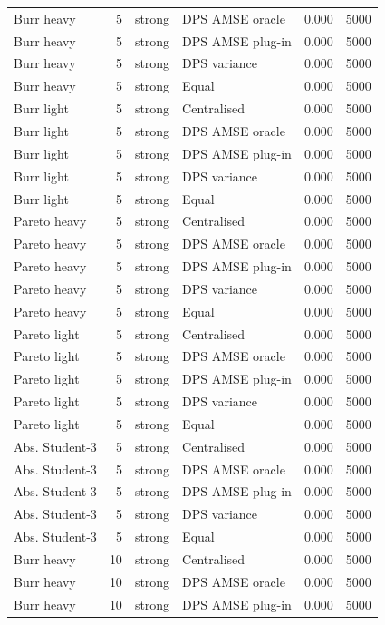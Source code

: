 \begin{tabular}{lrllrr}
Burr heavy & 5 & strong & DPS AMSE oracle & 0.000 & 5000 \\
Burr heavy & 5 & strong & DPS AMSE plug-in & 0.000 & 5000 \\
Burr heavy & 5 & strong & DPS variance & 0.000 & 5000 \\
Burr heavy & 5 & strong & Equal & 0.000 & 5000 \\
Burr light & 5 & strong & Centralised & 0.000 & 5000 \\
Burr light & 5 & strong & DPS AMSE oracle & 0.000 & 5000 \\
Burr light & 5 & strong & DPS AMSE plug-in & 0.000 & 5000 \\
Burr light & 5 & strong & DPS variance & 0.000 & 5000 \\
Burr light & 5 & strong & Equal & 0.000 & 5000 \\
Pareto heavy & 5 & strong & Centralised & 0.000 & 5000 \\
Pareto heavy & 5 & strong & DPS AMSE oracle & 0.000 & 5000 \\
Pareto heavy & 5 & strong & DPS AMSE plug-in & 0.000 & 5000 \\
Pareto heavy & 5 & strong & DPS variance & 0.000 & 5000 \\
Pareto heavy & 5 & strong & Equal & 0.000 & 5000 \\
Pareto light & 5 & strong & Centralised & 0.000 & 5000 \\
Pareto light & 5 & strong & DPS AMSE oracle & 0.000 & 5000 \\
Pareto light & 5 & strong & DPS AMSE plug-in & 0.000 & 5000 \\
Pareto light & 5 & strong & DPS variance & 0.000 & 5000 \\
Pareto light & 5 & strong & Equal & 0.000 & 5000 \\
Abs. Student-3 & 5 & strong & Centralised & 0.000 & 5000 \\
Abs. Student-3 & 5 & strong & DPS AMSE oracle & 0.000 & 5000 \\
Abs. Student-3 & 5 & strong & DPS AMSE plug-in & 0.000 & 5000 \\
Abs. Student-3 & 5 & strong & DPS variance & 0.000 & 5000 \\
Abs. Student-3 & 5 & strong & Equal & 0.000 & 5000 \\
Burr heavy & 10 & strong & Centralised & 0.000 & 5000 \\
Burr heavy & 10 & strong & DPS AMSE oracle & 0.000 & 5000 \\
Burr heavy & 10 & strong & DPS AMSE plug-in & 0.000 & 5000 \\

\end{tabular}
